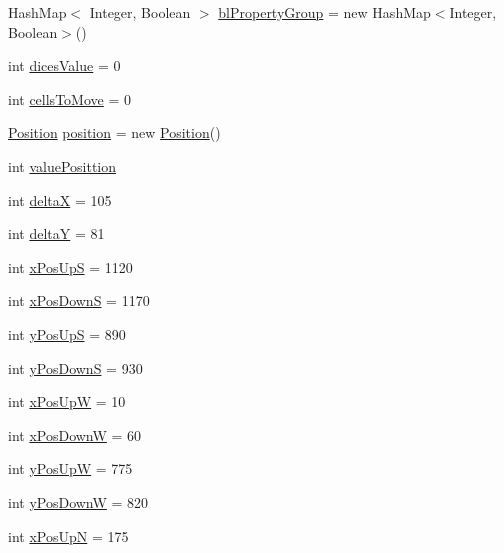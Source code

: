 \begin{DoxyCompactItemize}
\item 
Hash\+Map$<$ Integer, Boolean $>$ \hyperlink{class_monopoly_1_1_logic_1_1_player_a5dd9e787dab6824e9836e2db8b659554}{bl\+Property\+Group} = new Hash\+Map$<$Integer, Boolean$>$()
\item 
int \hyperlink{class_monopoly_1_1_logic_1_1_player_a73973f9d5106195b500c2c99c7e72abd}{dices\+Value} = 0
\item 
int \hyperlink{class_monopoly_1_1_logic_1_1_player_a9b17ab340918d686bcca176f7d4da366}{cells\+To\+Move} = 0
\item 
\hyperlink{class_monopoly_1_1_logic_1_1_position}{Position} \hyperlink{class_monopoly_1_1_logic_1_1_player_a0ceb685e27e7d2e8aec76e6e247c94aa}{position} = new \hyperlink{class_monopoly_1_1_logic_1_1_position}{Position}()
\item 
int \hyperlink{class_monopoly_1_1_logic_1_1_player_a005b4707e0457444f1de5053dd9f8f70}{value\+Posittion}
\item 
int \hyperlink{class_monopoly_1_1_logic_1_1_player_a726ddcf52ccfa413b17f4e13ac876231}{deltaX} = 105
\item 
int \hyperlink{class_monopoly_1_1_logic_1_1_player_aff17704c13a3c1c22221d3af045c855f}{deltaY} = 81
\item 
int \hyperlink{class_monopoly_1_1_logic_1_1_player_a3d36c3f626d2d89c280e49d267d339d9}{x\+Pos\+UpS} = 1120
\item 
int \hyperlink{class_monopoly_1_1_logic_1_1_player_a35ae55d36ab5e3bbea32990264023827}{x\+Pos\+DownS} = 1170
\item 
int \hyperlink{class_monopoly_1_1_logic_1_1_player_aca5512a435a1aa40f6457bf1b19ba399}{y\+Pos\+UpS} = 890
\item 
int \hyperlink{class_monopoly_1_1_logic_1_1_player_a36dd6fa206f1a11c7e8b1036262f05f5}{y\+Pos\+DownS} = 930
\item 
int \hyperlink{class_monopoly_1_1_logic_1_1_player_ae9495362deb48d4844f5e380a4704ab8}{x\+Pos\+UpW} = 10
\item 
int \hyperlink{class_monopoly_1_1_logic_1_1_player_ae4fc89dc28cdbd677309aac3f379485c}{x\+Pos\+DownW} = 60
\item 
int \hyperlink{class_monopoly_1_1_logic_1_1_player_a3de6131b99c15ef2a56b99252253db7f}{y\+Pos\+UpW} = 775
\item 
int \hyperlink{class_monopoly_1_1_logic_1_1_player_a8b40694b46d41b655f5afb70991cbbfe}{y\+Pos\+DownW} = 820
\item 
int \hyperlink{class_monopoly_1_1_logic_1_1_player_ab8e66d687225c46cd3d76a0344c886b6}{x\+Pos\+UpN} = 175

\end{DoxyCompactItemize}
